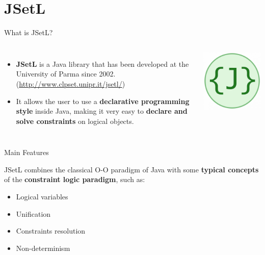 \section{JSetL}
\begin{frame}{What is JSetL?}
	\begin{columns}
        	\begin{itemize}
        	\setlength\itemsep{2em}
			\item \textbf{JSetL} is a Java library that has been developed at the University of Parma since 2002.\\
			(\url{http://www.clpset.unipr.it/jsetl/})\\
			\item It allows the user to use a \textbf{declarative programming style} inside Java, making it very easy to \textbf{declare and solve constraints} on logical objects.
			\end{itemize}

			\includegraphics[scale=0.3]{img/JSetL.png}
	\end{columns}
\end{frame}

\begin{frame}{Main Features}

JSetL combines the classical O-O paradigm of Java with some \textbf{typical concepts} of the \textbf{constraint logic paradigm}, such as:
\vspace{5 mm}
\begin{itemize}
\setlength\itemsep{2em}
        	\item Logical variables
        	\item Unification
        	\item Constraints resolution
        	\item Non-determinism
	\end{itemize}      
\end{frame}

